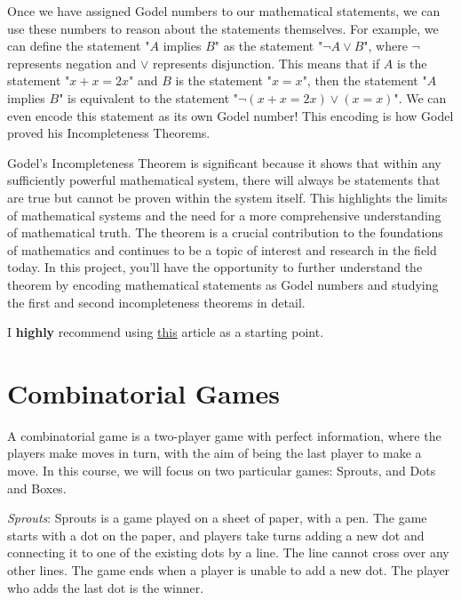 \documentclass{article}
\begin{document}
\vspace{3mm}
Once we have assigned Godel numbers to our mathematical statements, we can use these numbers to reason about the statements themselves. For example, we can define the statement "$A$ implies $B$" as the statement "$\neg A \vee B$", where $\neg$ represents negation and $\vee$ represents disjunction. This means that if $A$ is the statement "$x + x = 2x$" and $B$ is the statement "$x = x$", then the statement "$A$ implies $B$" is equivalent to the statement "$\neg(x + x = 2x) \vee (x = x)$". We can even encode this statement as its own Godel number! This encoding is how Godel proved his Incompleteness Theorems.

\vspace{3mm}
Godel's Incompleteness Theorem is significant because it shows that within any sufficiently powerful mathematical system, there will always be statements that are true but cannot be proven within the system itself. This highlights the limits of mathematical systems and the need for a more comprehensive understanding of mathematical truth. The theorem is a crucial contribution to the foundations of mathematics and continues to be a topic of interest and research in the field today. In this project, you'll have the opportunity to further understand the theorem by encoding mathematical statements as Godel numbers and studying the first and second incompleteness theorems in detail.

\vspace{3mm}
I \textbf{highly} recommend using \href{https://www.quantamagazine.org/how-godels-incompleteness-theorems-work-20200714/}{this} article as a starting point.

\pagebreak 

\section{Combinatorial Games}
A combinatorial game is a two-player game with perfect information, where the players make moves in turn, with the aim of being the last player to make a move. In this course, we will focus on two particular games: Sprouts, and Dots and Boxes.

\vspace{3mm}
\textit{Sprouts}: Sprouts is a game played on a sheet of paper, with a pen. The game starts with a dot on the paper, and players take turns adding a new dot and connecting it to one of the existing dots by a line. The line cannot cross over any other lines. The game ends when a player is unable to add a new dot. The player who adds the last dot is the winner.
\end{document}
